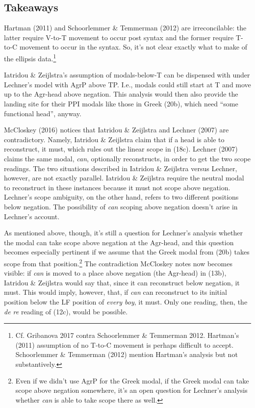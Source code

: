 \documentclass[]{ling-200b-2}
\begin{document}
\subsection{Takeaways}

Hartman (2011) and Schoorlemmer \& Temmerman (2012) are irreconcilable: the latter require V-to-T movement to occur post syntax and the former require T-to-C movement to occur in the syntax. So, it's not clear exactly what to make of the ellipsis data.\footnote{ Cf. Gribanova 2017 contra Schoorlemmer \& Temmerman 2012. Hartman's (2011) assumption of no T-to-C movement is perhaps difficult to accept. Schoorlemmer \& Temmerman (2012) mention Hartman's analysis but not substantively.}
    
Iatridou \& Zeijlstra's assumption of modals-below-T can be dispensed with under Lechner's model with AgrP above TP. I.e., modals could still start at T and move up to the Agr-head above negation. This analysis would then also provide the landing site for their PPI modals like those in Greek (20b), which need ``some functional head'', anyway.

McCloskey (2016) notices that Iatridou \& Zeijlstra and Lechner (2007) are contradictory. Namely, Iatridou \& Zeijlstra claim that if a head is able to reconstruct, it must, which rules out the linear scope in (18c). Lechner (2007) claims the same modal, \textit{can}, optionally reconstructs, in order to get the two scope readings. The two situations described in Iatridou \& Zeijlstra versus Lechner, however, are not exactly parallel. Iatridou \& Zeijlstra require the neutral modal to reconstruct in these instances because it must not scope above negation. Lechner's scope ambiguity, on the other hand, refers to two different positions below negation. The possibility of \textit{can} scoping above negation doesn't arise in Lechner's account.
    
As mentioned above, though, it's still a question for Lechner's analysis whether the modal can take scope above negation at the Agr-head, and this question becomes especially pertinent if we assume that the Greek modal from (20b) takes scope from that position.\footnote{ Even if we didn't use AgrP for the Greek modal, if the Greek modal can take scope above negation somewhere, it's an open question for Lechner's analysis whether \textit{can} is able to take scope there as well.} The contradiction McCloskey notes now becomes visible: if \textit{can} is moved to a place above negation (the Agr-head) in (13b), Iatridou \& Zeijlstra would say that, since it can reconstruct below negation, it must. This would imply, however, that, if \textit{can} can reconstruct to its initial position below the LF position of \textit{every boy}, it must. Only one reading, then, the \textit{de re} reading of (12c), would be possible.
\end{document}
